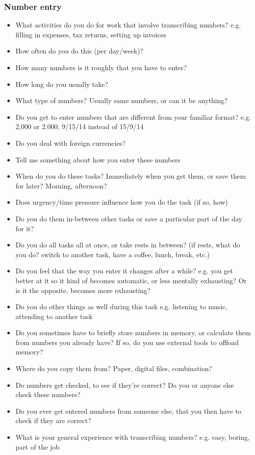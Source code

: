 \subsubsection{Number entry}
\begin{itemize}
\item  What activities do you do for work that involve transcribing numbers?
e.g. filling in expenses, tax returns, setting up invoices
\item How often do you do this (per day/week)?
\item How many numbers is it roughly that you have to enter?
\item How long do you usually take?
\item What type of numbers? Usually same numbers, or can it be anything?
\item Do you get to enter numbers that are different from your familiar format?
e.g. 2,000 or 2.000; 9/15/14 instead of 15/9/14
\item Do you deal with foreign currencies?
\item Tell me something about how you enter these numbers
\item When do you do these tasks? Immediately when you get them, or save them for later? Morning, afternoon?
\item Does urgency/time pressure influence how you do the task (if so, how)
\item Do you do them in-between other tasks or save a particular part of the day for it?
\item Do you do all tasks all at once, or take rests in between?
(if rests, what do you do? switch to another task, have a coffee, lunch, break, etc.)
\item Do you feel that the way you enter it changes after a while?
e.g. you get better at it so it kind of becomes automatic, or less mentally exhausting? Or is it the opposite, becomes more exhausting?
\item Do you do other things as well during this task
e.g. listening to music, attending to another task
\item Do you sometimes have to briefly store numbers in memory, or calculate them from numbers you already have?
If so, do you use external tools to offload memory?
\item Where do you copy them from? Paper, digital files, combination?
\item Do numbers get checked, to see if they're correct? Do you or anyone else check these numbers?
\item Do you ever get entered numbers from someone else, that you then have to check if they are correct?
\item What is your general experience with transcribing numbers?
e.g. easy, boring, part of the job
\end{itemize}
